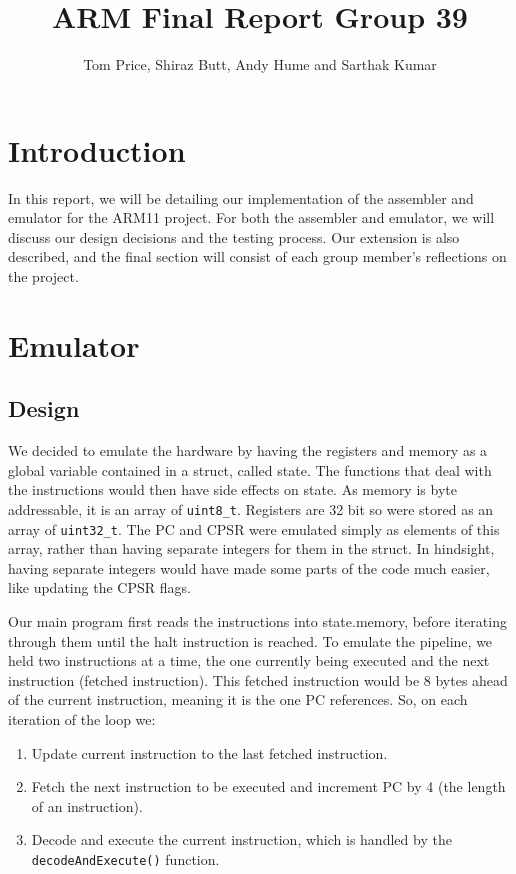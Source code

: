 \documentclass[a4paper]{article}
\title{ARM Final Report Group 39}
\author{Tom Price, Shiraz Butt, Andy Hume and Sarthak Kumar}
\begin{document}
\maketitle

\section{Introduction}

In this report, we will be detailing our implementation of the assembler and emulator for the ARM11 project. For both the assembler and emulator, we will discuss our design decisions and the testing process. Our extension is also described, and the final section will consist of each group member’s reflections on the project.

\section{Emulator}

\subsection{Design}

We decided to emulate the hardware by having the registers and memory as a global variable contained in a struct, called state. The functions that deal with the instructions would then have side effects on state. As memory is byte addressable, it is an array of \texttt{uint8\_t}. Registers are 32 bit so were stored as an array of \texttt{uint32\_t}. The PC and CPSR were emulated simply as elements of this array, rather than having separate integers for them in the struct. In hindsight, having separate integers would have made some parts of the code much easier, like updating the CPSR flags. 

Our main program first reads the instructions into state.memory, before iterating through them until the halt instruction is reached. To emulate the pipeline, we held two instructions at a time, the one currently being executed and the next instruction (fetched instruction). This fetched instruction would be 8 bytes ahead of the current instruction, meaning it is the one PC references. So, on each iteration of the loop we:

\begin{enumerate}
\item Update current instruction to the last fetched instruction.
\item Fetch the next instruction to be executed and increment PC by 4 (the length of an instruction).
\item Decode and execute the current instruction, which is handled by the \texttt{decodeAndExecute()} function.
\end{enumerate}
\end{document}
